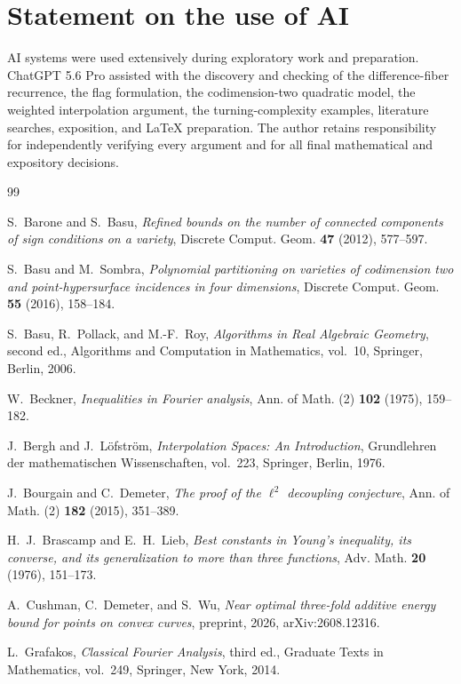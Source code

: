 \documentclass[11pt]{amsart}
\numberwithin{equation}{section}
\theoremstyle{definition}
\theoremstyle{remark}
\newcommand{\1}{\mathbf 1}
\begin{document}
\section{Statement on the use of AI}
AI systems were used extensively during exploratory work and preparation.  ChatGPT 5.6 Pro assisted with the discovery and checking of the difference-fiber recurrence, the flag formulation, the codimension-two quadratic model, the weighted interpolation argument, the turning-complexity examples, literature searches, exposition, and LaTeX preparation.  The author retains responsibility for independently verifying every argument and for all final mathematical and expository decisions.

\begin{thebibliography}{99}

S.~Barone and S.~Basu,
\emph{Refined bounds on the number of connected components of sign conditions on a variety},
Discrete Comput. Geom. \textbf{47} (2012), 577--597.

S.~Basu and M.~Sombra,
\emph{Polynomial partitioning on varieties of codimension two and point-hypersurface incidences in four dimensions},
Discrete Comput. Geom. \textbf{55} (2016), 158--184.

S.~Basu, R.~Pollack, and M.-F.~Roy,
\emph{Algorithms in Real Algebraic Geometry}, second ed.,
Algorithms and Computation in Mathematics, vol.~10, Springer, Berlin, 2006.

W.~Beckner,
\emph{Inequalities in Fourier analysis},
Ann. of Math. (2) \textbf{102} (1975), 159--182.

J.~Bergh and J.~L\"ofstr\"om,
\emph{Interpolation Spaces: An Introduction},
Grundlehren der mathematischen Wissenschaften, vol.~223, Springer, Berlin, 1976.

J.~Bourgain and C.~Demeter,
\emph{The proof of the $\ell^2$ decoupling conjecture},
Ann. of Math. (2) \textbf{182} (2015), 351--389.

H.~J.~Brascamp and E.~H.~Lieb,
\emph{Best constants in Young's inequality, its converse, and its generalization to more than three functions},
Adv. Math. \textbf{20} (1976), 151--173.

A.~Cushman, C.~Demeter, and S.~Wu,
\emph{Near optimal three-fold additive energy bound for points on convex curves},
preprint, 2026, arXiv:2608.12316.

L.~Grafakos,
\emph{Classical Fourier Analysis}, third ed.,
Graduate Texts in Mathematics, vol.~249, Springer, New York, 2014.


\end{thebibliography}
\end{document}
